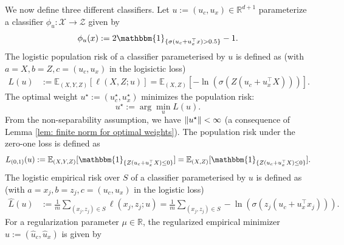 We now define three different classifiers. Let $u := (u_c, u_x) \in \mathbb{R}^{d+1}$ parameterize a classifier $ \phi_u: \mathcal{X} \rightarrow \mathcal{Z}$ given by
\begin{equation*}\phi_u(x) := 2\mathbbm{1}_{\{\sigma(u_c + u_x^\top x) > 0.5\}} - 1.
\end{equation*}
The logistic population risk of a classifier parameterised by $u$ is defined as (with $a = X, b= Z, c = (u_c, u_x)$ in the logisictic loss)
\begin{equation}\label{eqn: Logistic risk small}
\begin{aligned}
    L(u) &:= \mathbb{E}_{(X, Y, Z)}[\ell(X, Z; u)]=\mathbb{E}_{(X, Z)}[-\ln(\sigma(Z(u_c + u_x^\top X)))].
\end{aligned}
\end{equation}
The optimal weight $u^\star := (u^\star_c, u^\star_x)$ minimizes the population risk:
\begin{equation}\label{eqn: u star}
    u^\star := \arg\min_u L(u).
\end{equation}
From the non-separability assumption, we have $\|u^\star\| < \infty$ (a consequence of Lemma \ref{lem: finite norm for optimal weights}).
The
population risk under the zero-one loss is defined as
\begin{equation}\label{{eqn: zero-one risk}}
    L_{(0,1)}(u) := \E_{(X,Y,Z)}[\mathbbm{1}_{\{Z(u_c + u_x^\top X) \leq 0 \}}] = \E_{(X,Z)}[\mathbbm{1}_{\{Z(u_c + u_x^\top X) \leq 0 \}}] .
\end{equation}
The logistic empirical risk over $S$ of a classifier parameterised by $u$ is defined as (with $a = x_j, b= z_j, c = (u_c, u_x)$ in the logistic loss)
\begin{equation*}
\begin{aligned}
    \hat{L}(u) &:= \frac{1}{m} \sum_{(x_j, z_j) \in S} \ell(x_j, z_j; u) = \frac{1}{m} \sum_{(x_j, z_j) \in S}-\ln(\sigma(z_j(u_c + u_x^\top x_j))).
\end{aligned}
\end{equation*}
For a regularization parameter $\mu \in \mathbb{R}$, the regularized empirical minimizer $\hat{u} := (\hat{u}_c, \hat{u}_x)$\footnotemark{} is given by

